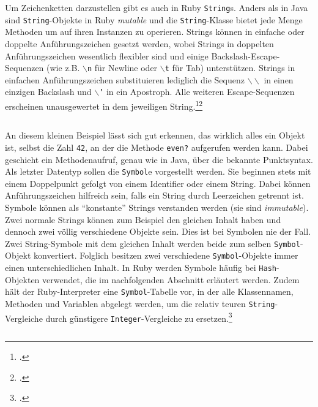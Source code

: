 \documentclass[a4paper, 11pt]{scrreprt}
\begin{document}
Um Zeichenketten darzustellen gibt es auch in Ruby \texttt{String}s. Anders als in Java sind \texttt{String}-Objekte in Ruby \textit{mutable} und die \texttt{String}-Klasse bietet jede Menge Methoden um auf ihren Instanzen zu operieren. Strings können in einfache oder doppelte Anführungszeichen gesetzt werden, wobei Strings in doppelten Anführungszeichen wesentlich flexibler sind und einige Backslash-Escape-Sequenzen (wie z.B. $\backslash$\texttt{n} für Newline oder \texttt{$\backslash$t} für Tab) unterstützen. Strings in einfachen Anführungszeichen substituieren lediglich die Sequenz $\backslash \backslash$ in einen einzigen Backslash und $\backslash$\texttt{'} in ein Apostroph. Alle weiteren Escape-Sequenzen erscheinen unausgewertet in dem jeweiligen String.\footcite[vgl.][S.46-47]{ruby_lang}\footcite[vgl.][S.316-317]{p_ruby}
\inputminted[]{ruby}{basictypes.rb}
An diesem kleinen Beispiel lässt sich gut erkennen, das wirklich alles ein Objekt ist, selbst die Zahl \texttt{42}, an der die Methode \texttt{even?} aufgerufen werden kann. Dabei geschieht ein Methodenaufruf, genau wie in Java, über die bekannte Punktsyntax.\\
Als letzter Datentyp sollen die \texttt{Symbol}e vorgestellt werden. Sie beginnen stets mit einem Doppelpunkt gefolgt von einem Identifier oder einem String. Dabei können Anführungszeichen hilfreich sein, falls ein String durch Leerzeichen getrennt ist. Symbole können als ``konstante'' Strings verstanden werden (sie sind \textit{immutable}). Zwei normale Strings können zum Beispiel den gleichen Inhalt haben und dennoch zwei völlig verschiedene Objekte sein. Dies ist bei Symbolen nie der Fall. Zwei String-Symbole mit dem gleichen Inhalt werden beide zum selben \texttt{Symbol}-Objekt konvertiert. Folglich besitzen zwei verschiedene \texttt{Symbol}-Objekte immer einen unterschiedlichen Inhalt. In Ruby werden Symbole häufig bei \texttt{Hash}-Objekten verwendet, die im nachfolgenden Abschnitt erläutert werden. Zudem hält der Ruby-Interpreter eine \texttt{Symbol}-Tabelle vor, in der alle Klassennamen, Methoden und Variablen abgelegt werden, um die relativ teuren \texttt{String}-Vergleiche durch günstigere \texttt{Integer}-Vergleiche zu ersetzen.\footcite[vgl.][S.70-71]{ruby_lang}%
\inputminted[]{ruby}{symbol.rb}
\end{document}
